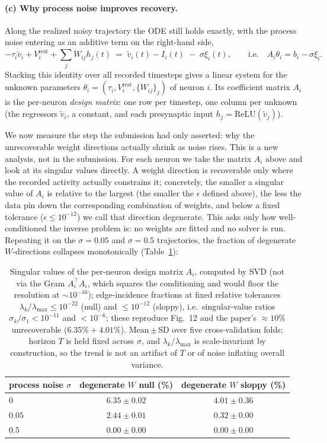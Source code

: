 \documentclass[11pt]{article}
\newcommand{\lmax}{\lambda_{\max}}
\begin{document}
\paragraph{(c) Why process noise improves recovery.}
Along the realized noisy trajectory the ODE still holds exactly, with the process
noise entering as an additive term on the right-hand side,
\[
  -\tau_i\dot{\tilde v}_i+V_i^{\mathrm{rest}}+\textstyle\sum_j W_{ij}h_j(t)
  \;=\;\tilde v_i(t)-I_i(t)\;-\;\sigma\xi_i(t),
  \qquad\text{i.e.}\quad A_i\theta_i=b_i-\sigma\xi_i .
\]
Stacking this identity over all recorded timesteps gives a linear system for the
unknown parameters $\theta_i=(\tau_i,V_i^{\mathrm{rest}},\{W_{ij}\}_j)$ of neuron
$i$. Its coefficient matrix $A_i$ is the per-neuron \emph{design matrix}: one row
per timestep, one column per unknown (the regressors $\dot{\tilde v}_i$, a
constant, and each presynaptic input $h_j=\mathrm{ReLU}(\tilde v_j)$).

We now measure the step the submission had only asserted: why the unrecoverable
weight directions actually shrink as noise rises. This is a new analysis, not in
the submission. For each neuron we take the matrix $A_i$ above and look at its
singular values directly. A weight direction is recoverable only where the
recorded activity actually constrains it; concretely, the smaller a singular value
of $A_i$ is relative to the largest (the smaller the $\epsilon$ defined above), the
less the data pin down the corresponding combination of weights, and below a fixed
tolerance ($\epsilon\le10^{-12}$) we call that direction degenerate. This asks only how well-conditioned the inverse
problem is: no weights are fitted and no solver is run. Repeating it on the
$\sigma=0.05$ and $\sigma=0.5$ trajectories, the fraction of degenerate
$W$-directions collapses monotonically (Table~\ref{tab:frac}):

\begin{table}[h]
\centering
\begin{tabular}{lcc}
\toprule
process noise $\sigma$ & degenerate $W$ null (\%) & degenerate $W$ sloppy (\%) \\
\midrule
$0$    & $6.35\pm0.02$ & $4.01\pm0.36$ \\
$0.05$ & $2.44\pm0.01$ & $0.32\pm0.00$ \\
$0.5$  & $0.00\pm0.00$ & $0.00\pm0.00$ \\
\bottomrule
\end{tabular}
\caption{Singular values of the per-neuron design matrix $A_i$, computed by SVD
(not via the Gram $A_i^{\!\top}A_i$, which squares the conditioning and would floor
the resolution at $\sim\!10^{-16}$); edge-incidence
fractions at fixed relative tolerances $\lambda_k/\lmax\le10^{-22}$ (null) and
$\le10^{-12}$ (sloppy), i.e.\ singular-value ratios $\sigma_k/\sigma_1<10^{-11}$ and
$<10^{-6}$; these reproduce Fig.~12 and the paper's $\approx\!10\%$ unrecoverable
($6.35\%+4.01\%$). Mean\,$\pm$\,SD over five cross-validation folds; horizon $T$ is
held fixed across $\sigma$, and $\lambda_k/\lmax$ is scale-invariant by
construction, so the trend is not an artifact of $T$ or of noise inflating overall
variance.}
\label{tab:frac}
\end{table}
\end{document}
